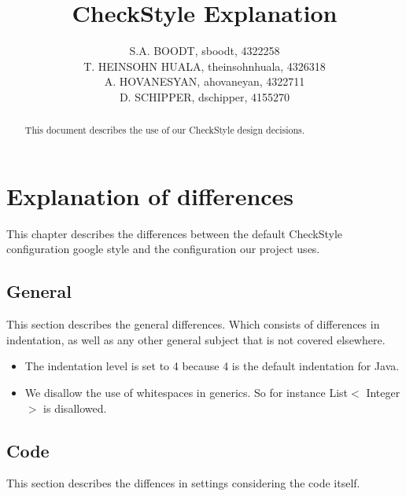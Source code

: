 \documentclass[11pt,a4paper]{report}
\title{CheckStyle Explanation}
\author{S.A. BOODT, sboodt, 4322258\\T. HEINSOHN HUALA, theinsohnhuala, 4326318\\A. HOVANESYAN, ahovaneyan, 4322711\\D. SCHIPPER, dschipper, 4155270}
\begin{document}
\maketitle
\begin{abstract}
This document describes the use of our CheckStyle design decisions.
\end{abstract}
\tableofcontents
\newpage
\chapter{Explanation of differences}

This chapter describes the differences between the default CheckStyle configuration google style and the configuration our project uses.

\section{General}

This section describes the general differences. Which consists of differences in indentation, as well as any other general subject that is not covered elsewhere.

\begin{itemize}

\item The indentation level is set to 4 because 4 is the default indentation for Java.

\item We disallow the use of whitespaces in generics. So for instance List$<$ Integer $>$ is disallowed.

\end{itemize}

\section{Code}

This section describes the diffences in settings considering the code itself.
\end{document}
